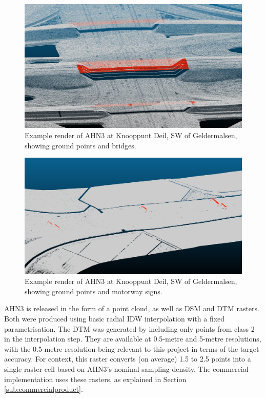 \begin{figure}
    \centering
    \includegraphics[width=\linewidth]{final_report/figs/ahn_sample_01.png} 
    \caption{Example render of AHN3 at Knooppunt Deil, SW of Geldermalsen, showing ground points and bridges.}
    \label{fig:ahnbridges}
\end{figure}

\begin{figure}
    \centering
    \includegraphics[width=\linewidth]{final_report/figs/ahn_sample_02.png} 
    \caption{Example render of AHN3 at Knooppunt Deil, SW of Geldermalsen, showing ground points and motorway signs.}
    \label{fig:ahnsigns}
\end{figure}

AHN3 is released in the form of a point cloud, as well as DSM and DTM rasters. Both were produced using basic radial IDW interpolation with a fixed parametrisation. The DTM was generated by including only points from class 2 in the interpolation step. They are available at 0.5-metre and 5-metre resolutions, with the 0.5-metre resolution being relevant to this project in terms of the target accuracy. For context, this raster converts (on average) 1.5 to 2.5 points into a single raster cell based on AHN3's nominal sampling density. The commercial implementation uses these rasters, as explained in Section \ref{sub:commercialproduct}.


